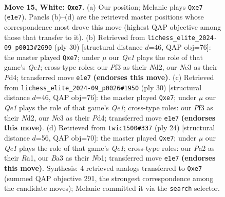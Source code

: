 \documentclass[11pt]{article}
\begin{document}
\begin{figure}[p]
\label{fig:thought-m26}
\end{figure}

\clearpage

\begin{figure}[p]\centering
\begin{subfigure}{0.46\textwidth}\centering
\resizebox{\linewidth}{!}{%
\newchessgame
\chessboard[
  setfen={r1b3k1/ppppqp1p/3n1b2/6p1/8/BPN2P2/P1PP2PP/R3QBK1 w - - 0 15},
  showmover=false,
  pgfstyle=straightmove, color=movearrow, markmove={e1-e7}
]}
\caption{}
\end{subfigure}\hfill
\begin{subfigure}{0.46\textwidth}\centering
\resizebox{\linewidth}{!}{%
\newchessgame
\chessboard[
  setfen={r5k1/pppbqppp/3p1b2/5n2/3P1B2/2P4P/PP1N1PP1/R3QBK1 w - - 3 16},
  showmover=false,
  pgfstyle=straightmove, color=movearrow, markmove={e1-e7}
]}
\caption{}
\end{subfigure}
\\[4pt]
\begin{subfigure}{0.46\textwidth}\centering
\resizebox{\linewidth}{!}{%
\newchessgame
\chessboard[
  setfen={r5k1/pppbqppp/3p1b2/5n2/3P1B2/2P4P/PP1N1PP1/R3QBK1 w - - 3 16},
  showmover=false,
  pgfstyle=straightmove, color=movearrow, markmove={e1-e7}
]}
\caption{}
\end{subfigure}\hfill
\begin{subfigure}{0.46\textwidth}\centering
\resizebox{\linewidth}{!}{%
\newchessgame
\chessboard[
  setfen={r1b3k1/ppppqppp/3n1b2/8/3P4/2P5/PP3PPP/RNB1QBK1 w - - 1 13},
  showmover=false,
  pgfstyle=straightmove, color=movearrow, markmove={e1-e7}
]}
\caption{}
\end{subfigure}
\caption{\textbf{Move 15, White: \texttt{Qxe7}.} (a) Our position; Melanie plays \texttt{Qxe7} (\texttt{e1e7}). Panels (b)--(d) are the retrieved master positions whose correspondence most drove this move (highest QAP objective among those that transfer to it). (b) Retrieved from \texttt{lichess\_elite\_2024-09\_p0013\#2690} (ply 30) [structural distance $d$=46, QAP obj=76]: the master played \texttt{Qxe7}; under $\mu$ our \emph{Qe1} plays the role of that game's \emph{Qe1}; cross-type roles: our \emph{P}f3 as their \emph{N}d2, our \emph{N}c3 as their \emph{P}d4; transferred move \texttt{e1e7} \textbf{(endorses this move)}. (c) Retrieved from \texttt{lichess\_elite\_2024-09\_p0026\#1950} (ply 30) [structural distance $d$=46, QAP obj=76]: the master played \texttt{Qxe7}; under $\mu$ our \emph{Qe1} plays the role of that game's \emph{Qe1}; cross-type roles: our \emph{P}f3 as their \emph{N}d2, our \emph{N}c3 as their \emph{P}d4; transferred move \texttt{e1e7} \textbf{(endorses this move)}. (d) Retrieved from \texttt{twic1500\#337} (ply 24) [structural distance $d$=56, QAP obj=70]: the master played \texttt{Qxe7}; under $\mu$ our \emph{Qe1} plays the role of that game's \emph{Qe1}; cross-type roles: our \emph{P}a2 as their \emph{R}a1, our \emph{B}a3 as their \emph{N}b1; transferred move \texttt{e1e7} \textbf{(endorses this move)}. Synthesis: 4 retrieved analogs transferred to \texttt{Qxe7} (summed QAP objective 291, the strongest correspondence among the candidate moves); Melanie committed it via the \texttt{search} selector.}

\end{figure}
\end{document}
